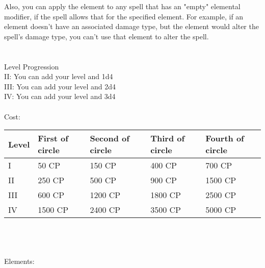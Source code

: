 Also, you can apply the element to any spell that has an "empty" elemental modifier, if the spell allows that for the specified element. For example, if an element doesn't have an associated damage type, but the element would alter the spell's damage type,  you can't use that element to alter the spell.\\
\\
\\
Level Progression\\
II: You can add your level and 1d4\\
III: You can add your level and 2d4\\
IV: You can add your level and 3d4\\
\\
Cost:\\
\begin{tabular}{l | p{2.5cm} | p{2.5cm} | p{2.5cm} | p{2.5cm}}
	Level & First of circle & Second of circle & Third of circle & Fourth of circle \\ \hline
	I & 50 CP & 150 CP & 400 CP & 700 CP\\
	II & 250 CP & 500 CP & 900 CP & 1500 CP\\
	III & 600 CP & 1200 CP & 1800 CP & 2500 CP\\
	IV & 1500 CP & 2400 CP & 3500 CP & 5000 CP\\
\end{tabular}
\\
\\
\\
Elements:\\
